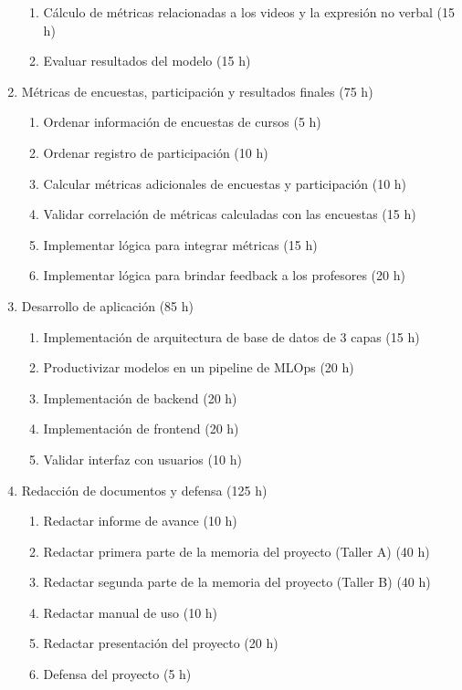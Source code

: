 \documentclass[
11pt, %
codirector, %
]{charter}
\begin{document}
\begin{enumerate}
\begin{enumerate}
    \item Cálculo de métricas relacionadas a los videos y la expresión no verbal (15 h)
    \item Evaluar resultados del modelo (15 h)
    \end{enumerate}
\item Métricas de encuestas, participación y resultados finales (75 h)
    \begin{enumerate}
    \item Ordenar información de encuestas de cursos (5 h)
    \item Ordenar registro de participación (10 h)
    \item Calcular métricas adicionales de encuestas y participación (10 h)
    \item Validar correlación de métricas calculadas con las encuestas (15 h)
    \item Implementar lógica para integrar métricas (15 h)
    \item Implementar lógica para brindar feedback a los profesores (20 h)
    \end{enumerate}
\item Desarrollo de aplicación (85 h)
    \begin{enumerate}
    \item Implementación de arquitectura de base de datos de 3 capas (15 h)
    \item Productivizar modelos en un pipeline de MLOps (20 h)
    \item Implementación de backend (20 h)
    \item Implementación de frontend (20 h)
    \item Validar interfaz con usuarios (10 h)
    \end{enumerate}
\item Redacción de documentos y defensa (125 h)
    \begin{enumerate}
    \item Redactar informe de avance (10 h)
    \item Redactar primera parte de la memoria del proyecto (Taller A) (40 h)
    \item Redactar segunda parte de la memoria del proyecto (Taller B) (40 h)
    \item Redactar manual de uso (10 h)
    \item Redactar presentación del proyecto (20 h)
    \item Defensa del proyecto (5 h)
    \end{enumerate}
\end{enumerate}
\end{document}
